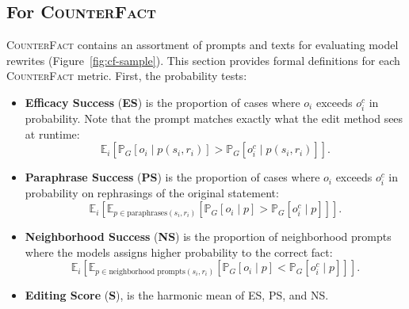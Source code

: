 \documentclass{article} %
\newcommand{\cfd}{\textsc{CounterFact}\xspace}
\newcommand{\exsub}[2]{\mathbb{E}_{#2}\left[ #1 \right]}
\newcommand{\prsub}[2]{\mathbb{P}_{#2}\left[ #1 \right]}
\newcommand{\reffig}[1]{Figure~\ref{fig:#1}}
\begin{document}
\subsection{For \cfd}

\cfd contains an assortment of prompts and texts for evaluating model rewrites (\reffig{cf-sample}). This section provides formal definitions for each \cfd metric. First, the probability tests:

\begin{itemize}[leftmargin=12pt, topsep=0pt]
    \item \textbf{Efficacy Success} (\textbf{ES}) is the proportion of cases where $o_i$ exceeds $o_i^c$ in probability. 
    Note that the prompt matches exactly what the edit method sees at runtime:
    \begin{equation}
        \exsub{\prsub{o_i \mid p(s_i, r_i)}{G} > \prsub{o_i^c \mid p(s_i, r_i)}{G}}{i}.
    \end{equation}
    
    
    \item \textbf{Paraphrase Success} (\textbf{PS}) is   the proportion of cases where $o_i$ exceeds $o_i^c$ in probability on rephrasings of the original statement:
    \begin{equation}
        \exsub{ \exsub{\prsub{o_i \mid p}{G} > \prsub{o_i^c \mid p}{G}}{p \in \text{paraphrases}(s_i, r_i)} }{i}.
    \end{equation}
    
    
    \item \textbf{Neighborhood Success} (\textbf{NS}) is
    the proportion of neighborhood prompts where the models assigns higher probability to the correct fact:
    \begin{equation}
        \exsub{\exsub{\prsub{o_i \mid p}{G} < \prsub{o_i^c \mid p}{G}}{p \in \text{neighborhood prompts}(s_i, r_i)}}{i}.
    \end{equation}
    
    \item \textbf{Editing Score} (\textbf{S}), is the harmonic mean of ES, PS, and NS.
\end{itemize}
\end{document}
